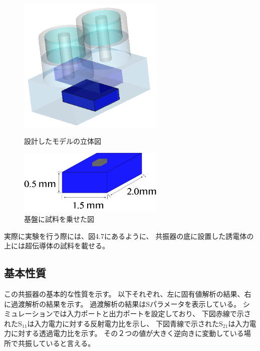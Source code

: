 \vspace{10 mm}

\begin{figure}[h]
 \begin{minipage}{0.5\hsize}
  \begin{center}
   \includegraphics[width=70mm]{./image/model73.png}
  \end{center}
  \caption{設計したモデルの立体図}
  \label{fig:one}
 \end{minipage}
 \begin{minipage}{0.5\hsize}
  \begin{center}
   \includegraphics[width=70mm]{./image/基板資料あり.png}
  \end{center}
  \caption{基盤に試料を乗せた図}
  \label{fig:two}
 \end{minipage}
\end{figure}

実際に実験を行う際には、図4.7にあるように、
共振器の底に設置した誘電体の上には超伝導体の試料を載せる。

\subsection*{基本性質}
この共振器の基本的な性質を示す。
以下それぞれ、左に固有値解析の結果、右に過渡解析の結果を示す。
過渡解析の結果はSパラメータを表示している。
シミュレーションでは入力ポートと出力ポートを設定しており、
下図赤線で示されたS$_{11}$は入力電力に対する反射電力比を示し、
下図青線で示されたS$_{21}$は入力電力に対する透過電力比を示す。
その２つの値が大きく逆向きに変動している場所で共振していると言える。


